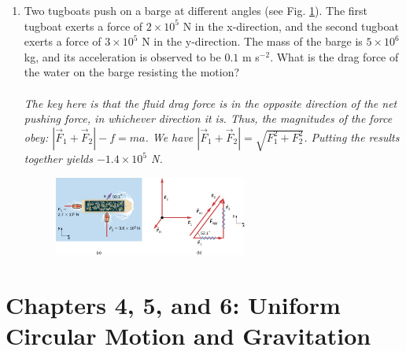 \documentclass[10pt]{article}
\begin{document}
\begin{enumerate}
\item Two tugboats push on a barge at different angles (see Fig. \ref{fig:boat}).  The first tugboat exerts a force of $2\times 10^5$ N in the x-direction, and the second tugboat exerts a force of $3 \times 10^5$ N in the y-direction. The mass of the barge is $5 \times 10^6$ kg, and its acceleration is observed to be $0.1$ m s$^{-2}$.  What is the drag force of the water on the barge resisting the motion? \\ \\
\textit{The key here is that the fluid drag force is in the opposite direction of the net pushing force, in whichever direction it is.  Thus, the magnitudes of the force obey: $|\vec{F}_1 + \vec{F}_2| - f = ma$.  We have $|\vec{F}_1 + \vec{F}_2| = \sqrt{F_1^2 + F_2^2}$.  Putting the results together yields $-1.4 \times 10^5$ N.}
\begin{figure}[ht]
\centering
\includegraphics[width=0.6\textwidth]{figures/boat.jpeg}
\caption{\label{fig:boat}}
\end{figure}
\end{enumerate}

\section{Chapters 4, 5, and 6: Uniform Circular Motion and Gravitation}
\end{document}
